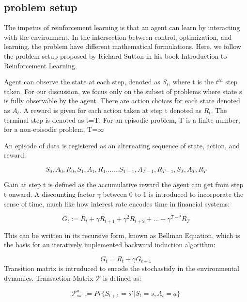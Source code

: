 \subsection{problem setup}
The impetus of reinforcement learning is that an agent can learn by interacting with the environment. In the intersection between control, optimization, and learning, the problem have different mathematical formulations. Here, we follow the problem setup proposed by Richard Sutton in his book Introduction to Reinforcement Learning. \cite{10.5555/551283}

Agent can observe the state at each step, denoted as $ S_{t} $, where t is the $t^{th}$ step taken. For our discussion, we focus only on the subset of problems where state s is fully observable by the agent. There are action choices for each state denoted as $ A_{t} $. A reward is given for each action taken at step t denoted as $ R_{t} $. The terminal step is denoted as t=T. For an episodic problem, T is a finite number, for a non-episodic problem, T=$\infty$

An episode of data is registered as an alternating sequence of state, action, and reward:

$$ S_{0}, A_{0}, R_{0}, S_{1}, A_{1}, R_{1}.......S_{T-1},A_{T-1},R_{T-1},S_{T},A_{T},R_{T} $$

Gain at step t is defined as the accumulative reward the agent can get from step t onward. A discounting factor $\gamma$ between 0 to 1 is introduced to incorporate the sense of time, much like how interest rate encodes time in financial systems:

\begin{equation}
G_{t} := R_{t}+\gamma R_{t+1}+\gamma ^2 R_{t+2}+...+\gamma^{T-t}R_{T}
\end{equation}


This can be written in its recursive form, known as Bellman Equation, which is the basis for an iteratively implemented backward induction algorithm:

\begin{equation}
        G_{t}=R_{t}+\gamma G_{t+1}
    \label{bellman}
\end{equation}
Transition matrix is intruduced to encode the stochastidy in the environmental dynamics. Transaction Matrix $\mathcal{P}$ is defined as:

\begin{equation}
    \mathcal{P}_{ss'}^a := Pr\{S_{t+1}=s'|S_{t}=s,A_{t}=a\}
\end{equation}


